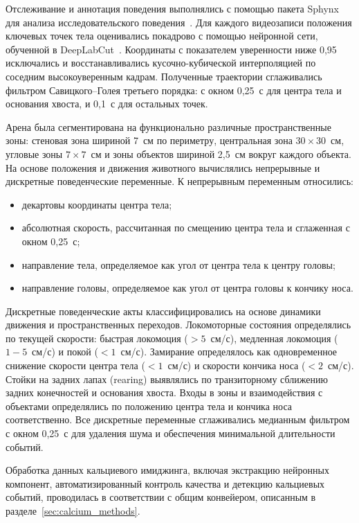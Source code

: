 Отслеживание и аннотация поведения выполнялись с помощью пакета Sphynx для анализа исследовательского поведения~\cite{Plusnin1}. Для каждого видеозаписи положения ключевых точек тела оценивались покадрово с помощью нейронной сети, обученной в DeepLabCut~\cite{Mathis}. Координаты с показателем уверенности ниже 0{,}95 исключались и восстанавливались кусочно-кубической интерполяцией по соседним высокоуверенным кадрам. Полученные траектории сглаживались фильтром Савицкого--Голея третьего порядка: с окном 0{,}25~с для центра тела и основания хвоста, и 0{,}1~с для остальных точек.

Арена была сегментирована на функционально различные пространственные зоны: стеновая зона шириной 7~см по периметру, центральная зона $30 \times 30$~см, угловые зоны $7 \times 7$~см и зоны объектов шириной 2{,}5~см вокруг каждого объекта. На основе положения и движения животного вычислялись непрерывные и дискретные поведенческие переменные. К непрерывным переменным относились:
\begin{itemize}
    \item декартовы координаты центра тела;
    \item абсолютная скорость, рассчитанная по смещению центра тела и сглаженная с окном 0{,}25~с;
    \item направление тела, определяемое как угол от центра тела к центру головы;
    \item направление головы, определяемое как угол от центра головы к кончику носа.
\end{itemize}

Дискретные поведенческие акты классифицировались на основе динамики движения и пространственных переходов. Локомоторные состояния определялись по текущей скорости: быстрая локомоция ($>5$~см/с), медленная локомоция ($1{-}5$~см/с) и покой ($<1$~см/с). Замирание определялось как одновременное снижение скорости центра тела ($<1$~см/с) и скорости кончика носа ($<2$~см/с). Стойки на задних лапах (rearing) выявлялись по транзиторному сближению задних конечностей и основания хвоста. Входы в зоны и взаимодействия с объектами определялись по положению центра тела и кончика носа соответственно. Все дискретные переменные сглаживались медианным фильтром с окном 0{,}25~с для удаления шума и обеспечения минимальной длительности событий.

Обработка данных кальциевого имиджинга, включая экстракцию нейронных компонент, автоматизированный контроль качества и детекцию кальциевых событий, проводилась в соответствии с общим конвейером, описанным в разделе~\ref{sec:calcium_methods}.
